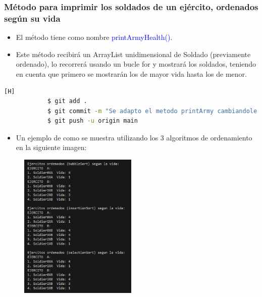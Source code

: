 \documentclass{article}
\begin{document}
        \newpage
        \subsubsection{Método para imprimir los soldados de un ejército, ordenados según su vida}
        
        \begin{itemize}
            \item El método tiene como nombre \textcolor{blue}{printArmyHealth()}.
            \item Este método recibirá un ArrayList unidimensional de Soldado (previamente ordenado), lo recorrerá usando un bucle for y mostrará los soldados, teniendo en cuenta que primero se mostrarán los de mayor vida hasta los de menor.
        \end{itemize}
        
        

        \begin{lstlisting}[language=bash,caption={Commit: Se implementaró el método showArmyHealth}][H]
    		$ git add .
    		$ git commit -m "Se adapto el metodo printArmy cambiandole el parametro y el metodo que accede al ArrayList, para de esta manera trabajar con los mismo"	
    		$ git push -u origin main
    	\end{lstlisting}

        \begin{itemize}
            \begin{itemize}
                \item Un ejemplo de como se muestra utilizando los 3 algoritmos de ordenamiento en la siguiente imagen:
            \end{itemize}
        \end{itemize}

        \begin{figure}[H]
            \centering
            \includegraphics[width=0.5\textwidth,keepaspectratio]{img/printArmyHealth.png}
            \caption{}
        \end{figure}
        
\end{document}
